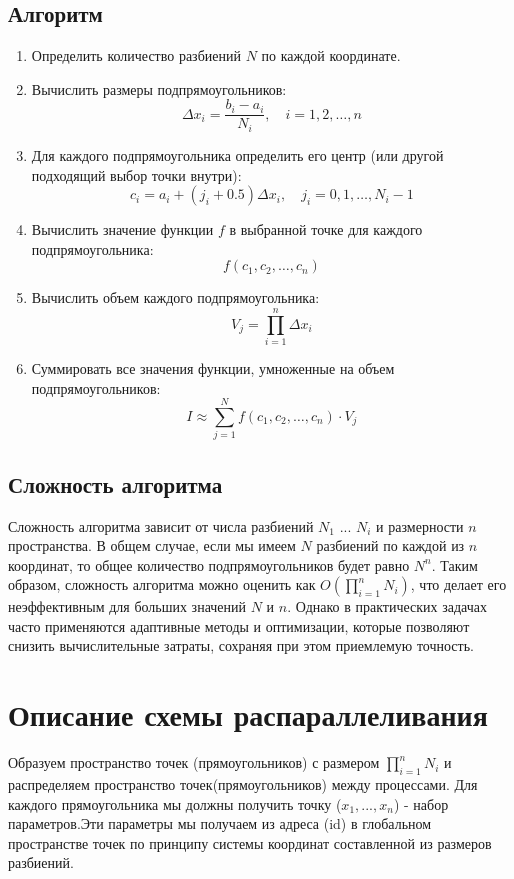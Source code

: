 \documentclass[12pt]{article}
\begin{document}
\subsection*{Алгоритм}
\begin{enumerate}
    \item  Определить количество разбиений $N$ по каждой координате.
    \item  Вычислить размеры подпрямоугольников:
    \[
    \Delta x_i = \frac{b_i - a_i}{N_i}, \quad i = 1, 2, \ldots, n
    \]
    \item  Для каждого подпрямоугольника определить его центр (или другой подходящий выбор точки внутри):
    \[
    c_{i} = a_i + \left(j_i + 0.5\right) \Delta x_i, \quad j_i = 0, 1, \ldots, N_i - 1
    \]
    \item  Вычислить значение функции $f$ в выбранной точке для каждого подпрямоугольника:
    \[
    f(c_1, c_2, \ldots, c_n)
    \]
    \item  Вычислить объем каждого подпрямоугольника:
    \[
    V_j = \prod_{i=1}^{n} \Delta x_i
    \]
    \item Суммировать все значения функции, умноженные на объем подпрямоугольников:
    \[
    I \approx \sum_{j=1}^{N} f(c_1, c_2, \ldots, c_n) \cdot V_j
    \]
\end{enumerate}

\subsection*{Сложность алгоритма}
Сложность алгоритма зависит от числа разбиений $N_1$ ... $N_i$ и размерности $n$ пространства. В общем случае, если мы имеем $N$ разбиений по каждой из $n$ координат, то общее количество подпрямоугольников будет равно $N^n$. Таким образом, сложность алгоритма можно оценить как $O\left(\prod\limits_{i=1}^{n} N_i\right)$, что делает его неэффективным для больших значений $N$ и $n$. Однако в практических задачах часто применяются адаптивные методы и оптимизации, которые позволяют снизить вычислительные затраты, сохраняя при этом приемлемую точность.

\section{Описание схемы распараллеливания}
Образуем пространство точек (прямоугольников) с размером \( \prod\limits_{i=1}^{n} N_i \) и распределяем пространство точек(прямоугольников)  между процессами. Для каждого прямоугольника мы должны получить точку ($x_1,...,x_n$) - набор параметров.Эти параметры мы получаем из адреса (id)  в глобальном пространстве точек по принципу системы координат составленной из размеров разбиений. 
\end{document}
